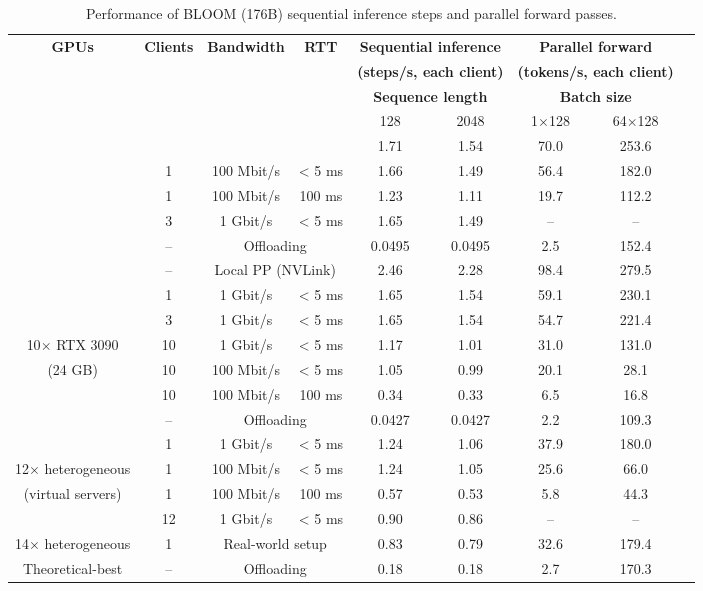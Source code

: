 \begin{table}[t]
\vspace{12pt}
  \centering
 \caption{Performance of BLOOM (176B) sequential inference steps and parallel forward passes.}
 \label{tbl:main_exp_table}
\setlength{\tabcolsep}{3pt}
\begin{tabular}{ccccccccc}\toprule
\multirow{5}{*}{\bf{GPUs}} &
\multirow{5}{*}{\bf{Clients}} &
\multirow{5}{*}{\bf{Bandwidth}} &
\multirow{5}{*}{\bf{RTT}} &
\multicolumn{2}{c}{\bf{Sequential inference}} &
\multicolumn{2}{c}{\bf{Parallel forward}}\\
& & & & \multicolumn{2}{c}{\bf{(steps/s, each client)}} & \multicolumn{2}{c}{\bf{(tokens/s, each client)}} \\
\cmidrule{5-8}
& & & & \multicolumn{2}{c}{\bf{Sequence length}} & \multicolumn{2}{c}{\bf{Batch size}}\\
\cmidrule{5-8}
& & & & 128 & 2048 & 1$\times$128 & 64$\times$128 \\
\midrule
\multirow{6}{*}{3$\times$ A100 (80 GB)} & 1 & 1 Gbit/s & < 5 ms  & 1.71 & 1.54 & 70.0 & 253.6 \\
& 1 & 100 Mbit/s & < 5 ms & 1.66 & 1.49 & 56.4 & 182.0 \\
& 1 & 100 Mbit/s & 100 ms & 1.23 & 1.11 & 19.7 & 112.2 \\
& 3 & 1 Gbit/s & < 5 ms & 1.65 & 1.49 & -- & -- \\
& -- & \multicolumn{2}{c}{Offloading} & 0.0495 & 0.0495 & 2.5 & 152.4 \\
& -- & \multicolumn{2}{c}{Local PP (NVLink)} & 2.46 & 2.28 & 98.4 & 279.5 \\
\midrule
& 1 & 1 Gbit/s & < 5 ms & 1.65 & 1.54 & 59.1 & 230.1 \\
& 3 & 1 Gbit/s & < 5 ms & 1.65 & 1.54 & 54.7 & 221.4 \\
10$\times$ RTX 3090 & 10 & 1 Gbit/s & < 5 ms & 1.17 & 1.01 & 31.0 & 131.0 \\
(24 GB) & 10 & 100 Mbit/s & < 5 ms & 1.05 & 0.99 & 20.1 & 28.1 \\
& 10 & 100 Mbit/s & 100 ms & 0.34 & 0.33 & 6.5 & 16.8 \\
& -- & \multicolumn{2}{c}{Offloading} & 0.0427 & 0.0427 & 2.2 & 109.3 \\
\midrule
& 1 & 1 Gbit/s & < 5 ms  & 1.24 & 1.06 & 37.9 & 180.0 \\
12$\times$ heterogeneous & 1 & 100 Mbit/s & < 5 ms & 1.24 & 1.05 & 25.6 & 66.0 \\
(virtual servers) & 1 & 100 Mbit/s & 100 ms & 0.57 & 0.53 & 5.8 & 44.3 \\
& 12 & 1 Gbit/s & < 5 ms & 0.90 & 0.86 & -- & -- \\
\midrule
14$\times$ heterogeneous & 1 & \multicolumn{2}{c}{Real-world setup} & 0.83 & 0.79 & 32.6 & 179.4 \\
\midrule
Theoretical-best & -- & \multicolumn{2}{c}{Offloading} & 0.18 & 0.18 & 2.7 & 170.3 \\
\bottomrule
\end{tabular}
\vspace{-10pt}
\end{table}

